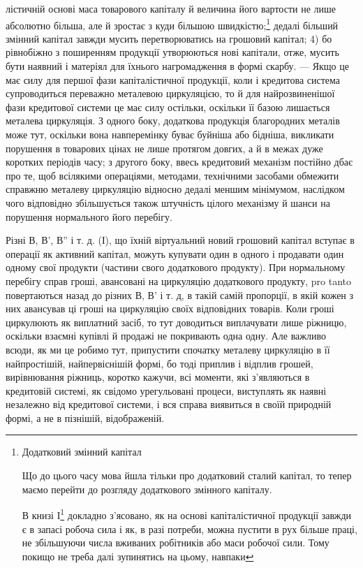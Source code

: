 лістичній основі маса товарового капіталу й величина його вартости не
лише абсолютно більша, але й зростає з куди більшою швидкістю;\footnote{
Додатковий змінний капітал

Що до цього часу мова йшла тільки про додатковий сталий капітал,
то тепер маємо перейти до розгляду додаткового змінного
капіталу.

В книзі І\footnote*{
Див. „Капітал“, т. I, розділ 23, § 3. — Ред.
} докладно з’ясовано, як на основі капіталістичної продукції
завжди є в запасі робоча сила і як, в разі потреби, можна пустити
в рух більше праці, не збільшуючи числа вживаних робітників або маси
робочої сили. Тому покищо не треба далі зупинятись на цьому, навпаки
} дедалі більший змінний капітал завжди мусить перетворюватись на
грошовий капітал; 4) бо рівнобіжно з поширенням продукції утворюються
нові капітали, отже, мусить бути наявний і матеріял для їхнього нагромадження
в формі скарбу. — Якщо це має силу для першої фази капіталістичної
продукції, коли і кредитова система супроводиться переважно
металевою циркуляцією, то й для найрозвиненішої фази кредитової
системи це має силу остільки, оскільки її базою лишається металева
циркуляція. З одного боку, додаткова продукція благородних металів
може тут, оскільки вона навперемінку буває буйніша або бідніша,
викликати порушення в товарових цінах не лише протягом довгих, а й
в межах дуже коротких періодів часу; з другого боку, ввесь кредитовий
механізм постійно дбає про те, щоб всілякими операціями, методами,
технічними засобами обмежити справжню металеву циркуляцію відносно
дедалі меншим мінімумом, наслідком чого відповідно збільшується також
штучність цілого механізму й шанси на порушення нормального його
перебігу.

Різні В, В', В'' і т. д. (І), що їхній віртуальний новий грошовий
капітал вступає в операції як активний капітал, можуть купувати один в одного
і продавати один одному свої продукти (частини свого додаткового
продукту). При нормальному перебігу справ гроші, авансовані на циркуляцію
додаткового продукту, pro tanto повертаються назад до різних
В, В' і т. д, в такій самій пропорції, в якій кожен з них авансував
ці гроші на циркуляцію своїх відповідних товарів. Коли гроші циркулюють
як виплатний засіб, то тут доводиться виплачувати лише ріжницю,
оскільки взаємні купівлі й продажі не покривають одна одну. Але важливо
всюди, як ми це робимо тут, припустити спочатку металеву циркуляцію
в її найпростішій, найпервіснішій формі, бо тоді приплив
і відплив грошей, вирівнювання ріжниць, коротко кажучи, всі моменти,
які з’являються в кредитовій системі, як свідомо урегульовані
процеси, виступлять як наявні незалежно від кредитової системи, і
вся справа виявиться в своїй природній формі, а не в пізнішій,
відображеній.